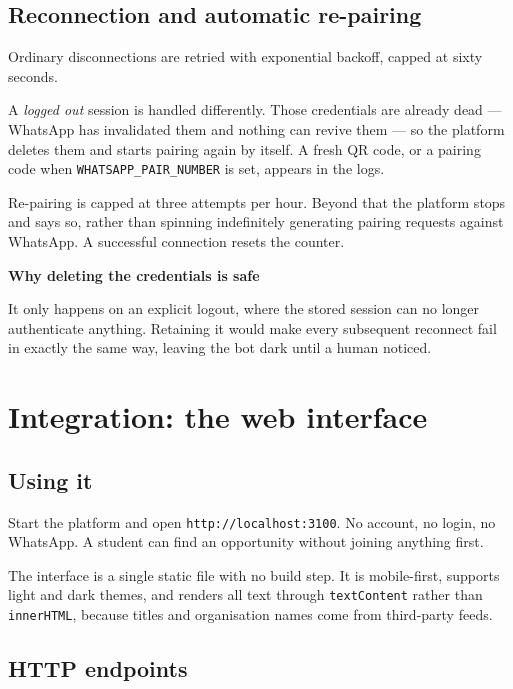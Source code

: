 \documentclass[11pt,a4paper]{report}
\newenvironment{callout}[1]
  {\begin{framed}\noindent\textbf{\textcolor{phcWarnInk}{#1}}\par\vspace{3pt}\small}
  {\end{framed}}
\newcommand{\dash}{---}
\begin{document}
\section{Reconnection and automatic re-pairing}

Ordinary disconnections are retried with exponential backoff, capped at sixty
seconds.

A \emph{logged out} session is handled differently. Those credentials are
already dead \dash{} WhatsApp has invalidated them and nothing can revive them
\dash{} so the platform deletes them and starts pairing again by itself. A
fresh QR code, or a pairing code when \texttt{WHATSAPP\_PAIR\_NUMBER} is set,
appears in the logs.

Re-pairing is capped at three attempts per hour. Beyond that the platform stops
and says so, rather than spinning indefinitely generating pairing requests
against WhatsApp. A successful connection resets the counter.

\begin{callout}{Why deleting the credentials is safe}
It only happens on an explicit logout, where the stored session can no longer
authenticate anything. Retaining it would make every subsequent reconnect fail
in exactly the same way, leaving the bot dark until a human noticed.
\end{callout}

\chapter{Integration: the web interface}

\section{Using it}

Start the platform and open \texttt{http://localhost:3100}. No account, no
login, no WhatsApp. A student can find an opportunity without joining anything
first.

The interface is a single static file with no build step. It is mobile-first,
supports light and dark themes, and renders all text through
\texttt{textContent} rather than \texttt{innerHTML}, because titles and
organisation names come from third-party feeds.

\section{HTTP endpoints}
\end{document}
